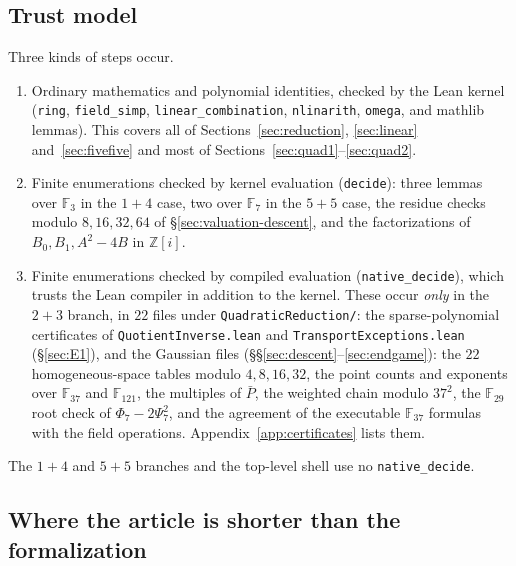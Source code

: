 \documentclass[10pt]{article}
\theoremstyle{definition}
\theoremstyle{remark}
\newcommand{\Z}{\mathbb{Z}}
\newcommand{\F}{\mathbb{F}}
\begin{document}
\subsection{Trust model}

Three kinds of steps occur.
\begin{enumerate}
\item Ordinary mathematics and polynomial identities, checked by the Lean
kernel (\texttt{ring}, \texttt{field\_\allowbreak simp}, \texttt{linear\_\allowbreak combination},
\texttt{nlinarith}, \texttt{omega}, and mathlib lemmas).  This covers all of
Sections~\ref{sec:reduction}, \ref{sec:linear} and~\ref{sec:fivefive} and most
of Sections~\ref{sec:quad1}--\ref{sec:quad2}.
\item Finite enumerations checked by kernel evaluation (\texttt{decide}):
three lemmas over $\F_3$ in the $1+4$ case, two over $\F_7$ in the $5+5$ case,
the residue checks modulo $8,16,32,64$ of \S\ref{sec:valuation-descent}, and the
factorizations of $B_0,B_1,A^2-4B$ in $\Z[i]$.
\item Finite enumerations checked by compiled evaluation
(\texttt{native\_\allowbreak decide}), which trusts the Lean compiler in addition to the
kernel.  These occur \emph{only} in the $2+3$ branch, in $22$ files under
\texttt{Quadratic\allowbreak Reduction/\allowbreak }: the sparse-polynomial certificates of
\texttt{Quotient\allowbreak Inverse.\allowbreak lean} and \texttt{Transport\allowbreak Exceptions.\allowbreak lean}
(\S\ref{sec:E1}), and the Gaussian files (\S\S\ref{sec:descent}--\ref{sec:endgame}):
the $22$ homogeneous-space tables modulo $4,8,16,32$, the point counts and
exponents over $\F_{37}$ and $\F_{121}$, the multiples of $\bar P$, the
weighted chain modulo $37^2$, the $\F_{29}$ root check of $\Phi_7-2\Psi_7^2$,
and the agreement of the executable $\F_{37}$ formulas with the field
operations.  Appendix~\ref{app:certificates} lists them.
\end{enumerate}
The $1+4$ and $5+5$ branches and the top-level shell use no
\texttt{native\_\allowbreak decide}.

\subsection{Where the article is shorter than the formalization}
\end{document}
